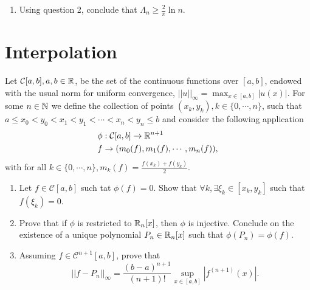 \begin{enumerate}
\begin{proof}
	while the last term is
	\[ \frac{2}{\pi}\int_{\frac{\theta_n}{2}}^\frac{\pi}{2}\cot t\ud t\leq\cot\frac{\theta_n}{2}\left(\frac{\pi}{2}-\frac{\theta_n}{2}\right)=\frac{\pi}{4(n+1)}\cot\frac{\theta_n}{2}\leq\frac{\pi}{2(n+1)}\cot\frac{\theta_n}{2}. \]
	Combine these two results together,
	\[ \frac{2}{\pi}\int_{\frac{\theta_0}{2}}^\frac{\pi}{2}\cot t\ud t\leq\sum_{i=0}^{n-1}\frac{2}{\pi}\cdot\frac{\pi}{2(n+1)}\cdot\cot\frac{\theta_i}{2}+\frac{2}{\pi}\cdot\frac{\pi}{2(n+1)}\cot\frac{\theta_n}{2}=\frac{1}{n+1}\sum_{i=0}^{n}\cot\frac{\theta_i}{2} \]
	\end{proof}
	\item Using question 2, conclude that \(\Lambda_n\geq\frac{2}{\pi}\ln n\).
\end{enumerate}

\section{Interpolation}
Let \(\mathcal{C}[a,b], a,b\in\mathbb{R}\), be the set of the continuous functions over \([a,b]\), endowed with the usual norm for uniform convergence, \(||u||_\infty=\max_{x\in[a,b]}|u(x)|\).
For some \(n\in\mathbb{N}\) we define the collection of points \((x_k,y_k), k\in\{0,\cdots,n\}\), such that \(a\leq x_0<y_0<x_1<y_1<\cdots<x_n<y_n\leq b\) and consider the following application
\begin{align*}
	\phi&:\mathcal{C}[a,b]\to\mathbb{R}^{n+1}\\
	f&\to(m_0(f),m_1(f),\cdots,m_n(f)),
\end{align*}
with for all \(k\in\{0,\cdots,n\},m_k(f)=\frac{f(x_k)+f(y_k)}{2}\).
\begin{enumerate}
	\item Let \(f\in\mathcal{C}[a,b]\) such tat \(\phi(f)=0\).
	Show that \(\forall k,\exists\xi_k\in[x_k,y_k]\) such that \(f(\xi_k)=0\).
	\item Prove that if $\phi$ is restricted to \(\mathbb{R}_n[x]\), then $\phi$ is injective.
	Conclude on the existence of a unique polynomial \(P_n\in\mathbb{R}_n[x]\) such that \(\phi(P_n)=\phi(f)\).
	\item Assuming \(f\in\mathcal{C}^{n+1}[a,b]\), prove that
	\[ ||f-P_n||_\infty=\frac{(b-a)^{n+1}}{(n+1)!}\sup_{x\in[a,b]}|f^{(n+1)}(x)|. \]
\end{enumerate}

